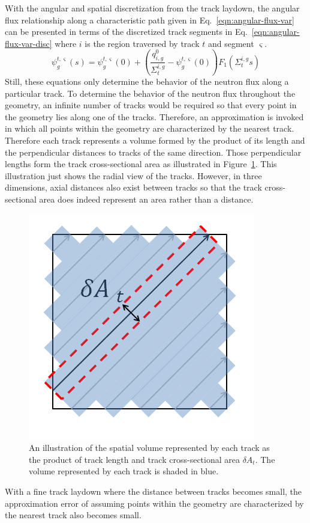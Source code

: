 With the angular and spatial discretization from the track laydown, the angular flux relationship along a characteristic path given in Eq.~\ref{eqn:angular-flux-var} can be presented in terms of the discretized track segments in Eq.~\ref{eqn:angular-flux-var-disc} where $i$ is the region traversed by track $t$ and segment $\varsigma$. 
\begin{dmath}
	\psi_g^{t,\varsigma}(s) = \psi^{t,\varsigma}_g(0) + \left( \frac{q^0_{i,g}}{\Sigma_{t}^{i,g}} - \psi_g^{t,\varsigma}(0) \right) F_1\left(\Sigma_{t}^{i,g} s \right)
	\label{eqn:angular-flux-var-disc}
\end{dmath}
Still, these equations only determine the behavior of the neutron flux along a particular track. To determine the behavior of the neutron flux throughout the geometry, an infinite number of tracks would be required so that every point in the geometry lies along one of the tracks. Therefore, an approximation is invoked in which all points within the geometry are characterized by the nearest track. Therefore each track represents a volume formed by the product of its length and the perpendicular distances to tracks of the same direction. Those perpendicular lengths form the track cross-sectional area as illustrated in Figure~\ref{fig:track-cross-section}. This illustration just shows the radial view of the tracks. However, in three dimensions, axial distances also exist between tracks so that the track cross-sectional area does indeed represent an area rather than a distance.
\begin{figure}[h!]
	\centering
	\includegraphics[width=0.6\linewidth]{figures/track-cross-sectional-area.PNG}
	\caption[]{An illustration of the spatial volume represented by each track as the product of track length and track cross-sectional area $\delta A_t$. The volume represented by each track is shaded in blue.}
	\label{fig:track-cross-section}
\end{figure}
With a fine track laydown where the distance between tracks becomes small, the approximation error of assuming points within the geometry are characterized by the nearest track also becomes small. 

